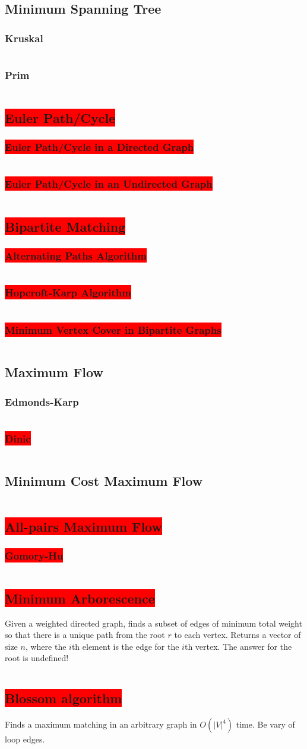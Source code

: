 \documentclass[8pt,a4paper,landscape,oneside]{amsart}
\newcommand{\code}[1]{\inputminted[fontsize=\normalsize,baselinestretch=1]{cpp}{_code/#1}}
\newcommand{\subsectionRed}[1]{\subsection{\colorbox{red}{\color{white}#1}}}
\newcommand{\subsubsectionRed}[1]{\subsubsection{\colorbox{red}{\color{white}#1}}}
\begin{document}
\begin{multicols*}{3}
	\subsection{Minimum Spanning Tree}
		\subsubsection{Kruskal}
      \code{graphs/mst/kruskal.cpp}
		\subsubsection{Prim}
      \code{graphs/mst/prim.cpp}
	\subsectionRed{Euler Path/Cycle}
    \subsubsectionRed{Euler Path/Cycle in a Directed Graph}
      \code{graphs/euler_path.cpp}
    \subsubsectionRed{Euler Path/Cycle in an Undirected Graph}
      \code{graphs/euler_path_undirected.cpp}
	\subsectionRed{Bipartite Matching}
		\subsubsectionRed{Alternating Paths Algorithm}
      \code{graphs/bipartite_matching/bipartite_matching.cpp}
		\subsubsectionRed{Hopcroft-Karp Algorithm}
      \code{graphs/bipartite_matching/hopcroft_karp.cpp}
    \subsubsectionRed{Minimum Vertex Cover in Bipartite Graphs}
      \code{graphs/bipartite_matching/bipartite_mvc.cpp}
	\subsection{Maximum Flow}
		\subsubsection{Edmonds-Karp}
			\code{graphs/max_flow/edmonds_karp.cpp}
		\subsubsectionRed{Dinic}
			\code{graphs/max_flow/dinic.cpp}
  \subsection{Minimum Cost Maximum Flow}
    \code{graphs/max_flow/mcst.cpp}
  \subsectionRed{All-pairs Maximum Flow}
    \subsubsectionRed{Gomory-Hu}
      \code{graphs/max_flow/gomory_hu_tree.cpp}
  \subsectionRed{Minimum Arborescence}
    Given a weighted directed graph, finds a subset of edges of minimum
    total weight so that there is a unique path from the root $r$ to each
    vertex. Returns a vector of size $n$, where the $i$th element is the
    edge for the $i$th vertex. The answer for the root is undefined!
    \code{graphs/arborescence.cpp}
  \subsectionRed{Blossom algorithm}
    Finds a maximum matching in an arbitrary graph in $O(|V|^4)$ time. Be
    vary of loop edges.
    \code{graphs/blossom.cpp}

\end{multicols*}
\end{document}

